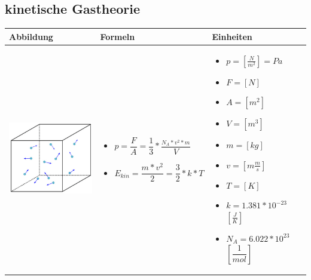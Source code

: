 \newpage

\subsection{kinetische Gastheorie}				%
\begin{table}[h!]
	\begin{tabular}{ | m{6cm} | m{6cm} | m{6cm} | }
		\hline
		Abbildung & Formeln & Einheiten \\ \hline
		\midrule
		\begin{minipage}{.3\textwidth}
			\includegraphics[width=6.0cm]{Figures/Gastheorie}
		\end{minipage}
		&
		\begin{itemize}
			\item$p=\dfrac{F}{A}=\dfrac{1}{3}*\dfrac{_{N_{A}*v^{2}*m}}{V}$ 
			\item$E_{kin}=\dfrac{m*v^{2}}{2}=\dfrac{3}{2}*k*T$
			
		\end{itemize}
		& 
		\begin{itemize}
			\item $p= [\frac{N}{m^{2}}]=Pa$
			\item $F=[N]$
			\item $A=[m^2]$
			\item $V=[m^3]$
			\item $m=[kg]$
			\item $v=[m\frac{m}{s}]$
			\item $T=[K]$
			\item $k=1.381*10^{-23}$ $[\frac{J}{K}]$
			\item $N_{A}=6.022*10^{23}$ $[\dfrac{1}{mol}] $
			
		\end{itemize}
		\\ \hline
	\end{tabular}
\end{table}

